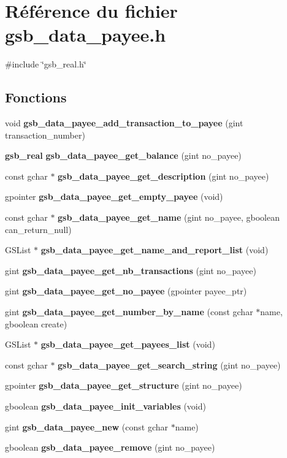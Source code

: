 \section{Référence du fichier gsb\_\-data\_\-payee.h}
\label{gsb__data__payee_8h}
{\ttfamily \#include \char`\"{}gsb\_\-real.h\char`\"{}}\par
\subsection*{Fonctions}
\begin{DoxyCompactItemize}
\item 
void {\bf gsb\_\-data\_\-payee\_\-add\_\-transaction\_\-to\_\-payee} (gint transaction\_\-number)
\item 
{\bf gsb\_\-real} {\bf gsb\_\-data\_\-payee\_\-get\_\-balance} (gint no\_\-payee)
\item 
const gchar $\ast$ {\bf gsb\_\-data\_\-payee\_\-get\_\-description} (gint no\_\-payee)
\item 
gpointer {\bf gsb\_\-data\_\-payee\_\-get\_\-empty\_\-payee} (void)
\item 
const gchar $\ast$ {\bf gsb\_\-data\_\-payee\_\-get\_\-name} (gint no\_\-payee, gboolean can\_\-return\_\-null)
\item 
GSList $\ast$ {\bf gsb\_\-data\_\-payee\_\-get\_\-name\_\-and\_\-report\_\-list} (void)
\item 
gint {\bf gsb\_\-data\_\-payee\_\-get\_\-nb\_\-transactions} (gint no\_\-payee)
\item 
gint {\bf gsb\_\-data\_\-payee\_\-get\_\-no\_\-payee} (gpointer payee\_\-ptr)
\item 
gint {\bf gsb\_\-data\_\-payee\_\-get\_\-number\_\-by\_\-name} (const gchar $\ast$name, gboolean create)
\item 
GSList $\ast$ {\bf gsb\_\-data\_\-payee\_\-get\_\-payees\_\-list} (void)
\item 
const gchar $\ast$ {\bf gsb\_\-data\_\-payee\_\-get\_\-search\_\-string} (gint no\_\-payee)
\item 
gpointer {\bf gsb\_\-data\_\-payee\_\-get\_\-structure} (gint no\_\-payee)
\item 
gboolean {\bf gsb\_\-data\_\-payee\_\-init\_\-variables} (void)
\item 
gint {\bf gsb\_\-data\_\-payee\_\-new} (const gchar $\ast$name)
\item 
gboolean {\bf gsb\_\-data\_\-payee\_\-remove} (gint no\_\-payee)
\item 

\end{DoxyCompactItemize}
